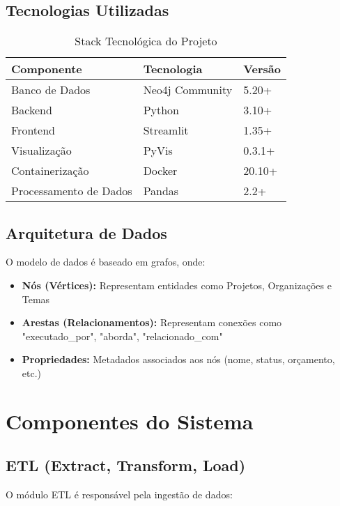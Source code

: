 \documentclass[12pt,a4paper]{article}
\begin{document}
\subsection{Tecnologias Utilizadas}

\begin{table}[h]
\centering
\begin{tabular}{@{}lll@{}}
\toprule
\textbf{Componente} & \textbf{Tecnologia} & \textbf{Versão} \\
\midrule
Banco de Dados & Neo4j Community & 5.20+ \\
Backend & Python & 3.10+ \\
Frontend & Streamlit & 1.35+ \\
Visualização & PyVis & 0.3.1+ \\
Containerização & Docker & 20.10+ \\
Processamento de Dados & Pandas & 2.2+ \\
\bottomrule
\end{tabular}
\caption{Stack Tecnológica do Projeto}
\end{table}

\subsection{Arquitetura de Dados}

O modelo de dados é baseado em grafos, onde:

\begin{itemize}
    \item \textbf{Nós (Vértices):} Representam entidades como Projetos, Organizações e Temas
    \item \textbf{Arestas (Relacionamentos):} Representam conexões como "executado\_por", "aborda", "relacionado\_com"
    \item \textbf{Propriedades:} Metadados associados aos nós (nome, status, orçamento, etc.)
\end{itemize}

\section{Componentes do Sistema}

\subsection{ETL (Extract, Transform, Load)}

O módulo ETL é responsável pela ingestão de dados:
\end{document}
